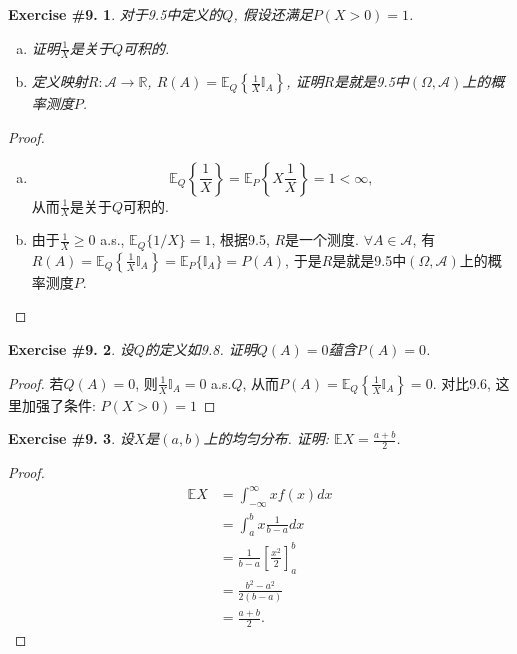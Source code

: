 \documentclass[UTF8, a4paper]{article}
\newtheorem{exercise}{Exercise \#9.}
\begin{document}
\begin{framed}
\begin{exercise}
对于9.5中定义的\(Q\), 假设还满足\(P(X > 0) = 1\).
\begin{enumerate}[(a)]
    \item 证明\(\frac{1}{X}\)是关于\(Q\)可积的.
    \item 定义映射\(R: \mathcal{A} \to \mathbb{R}\), \(R(A) = \mathbb{E}_Q\left\{\frac{1}{X} \mathbb{I}_A\right\}\), 证明\(R\)是就是9.5中\((\Omega, \mathcal{A})\)上的概率测度\(P\).
\end{enumerate}
\end{exercise}
\end{framed}


\begin{proof}
\begin{enumerate}[(a)]
    \item $$\mathbb{E}_Q\left\{\frac{1}{X}\right\} = \mathbb{E}_P\left\{X\frac{1}{X}\right\} = 1 < \infty,$$从而\(\frac{1}{X}\)是关于\(Q\)可积的.
    \item 由于\(\frac{1}{X} \geq 0\) a.s., \(\mathbb{E}_Q \{1/X\} = 1\), 根据9.5, \(R\)是一个测度. \(\forall A \in \mathcal{A}\), 有\(R(A) = \mathbb{E}_Q \left\{\frac{1}{X} \mathbb{I}_A\right\} = \mathbb{E}_P\{\mathbb{I}_A\} = P(A)\), 于是\(R\)是就是9.5中\((\Omega, \mathcal{A})\)上的概率测度\(P\).
\end{enumerate}
\end{proof}

\begin{framed}
\begin{exercise}
设\(Q\)的定义如9.8. 证明\(Q(A) = 0\)蕴含\(P(A) = 0\).
\end{exercise}
\end{framed}

\begin{proof}
若\(Q(A) = 0\), 则\(\frac{1}{X}\mathbb{I}_A = 0\) a.s.\(Q\), 从而\(P(A) = \mathbb{E}_Q \left\{\frac{1}{X} \mathbb{I}_A\right\} = 0\).
对比9.6, 这里加强了条件: \(P(X > 0) = 1\)
\end{proof}


\begin{framed}
\begin{exercise}
设\(X\)是\((a,b)\)上的均匀分布. 证明: \(\mathbb{E}X = \frac{a+b}{2}\).
\end{exercise}
\end{framed}

\begin{proof}
$$
\begin{aligned}
    \mathbb{E}X &= \int_{-\infty}^{\infty} x f(x) dx \\
    &= \int_{a}^{b} x \frac{1}{b-a} dx \\
    &= \frac{1}{b-a} \left[\frac{x^2}{2}\right]_a^b \\
    &= \frac{b^2 - a^2}{2(b-a)} \\
    &= \frac{a+b}{2}.
\end{aligned}
$$
\end{proof}
\end{document}
